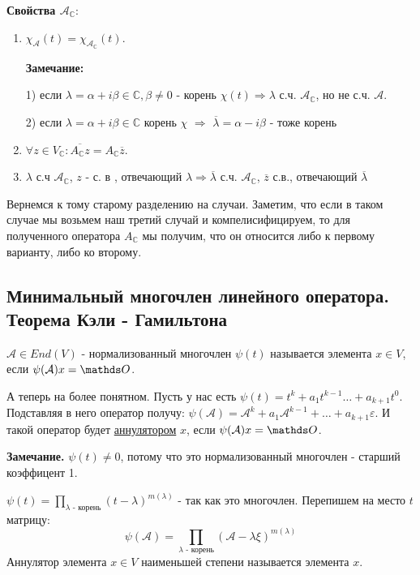 \textbf{Свойства $\mathcal{A_\mathbb{C}}$}:

\begin{enumerate}
    \item $\chi_{\mathcal{A}} (t)= \chi_\mathcal{A_\mathbb{C}}(t)$.

    \textbf{Замечание:} 
    
    1) если $\lambda = \alpha + i\beta \in \mathbb{C}, \beta \neq 0$ - корень $\chi(t) \Rightarrow \lambda$ с.ч. $\mathcal{A_\mathbb{C}}$, но не с.ч. $\mathcal{A}$.

    2) если $\lambda = \alpha + i\beta \in \mathbb{C}$ корень $\chi$ $\Rightarrow$ $\overline{\lambda}=\alpha - i\beta$ - тоже корень

    \item $\forall z \in V_{\mathbb{C}}: \overline{A_{\mathbb{C}}z } = A_{\mathbb{C}}\overline{z}$.

    \item $\lambda$ с.ч $\mathcal{A_\mathbb{C}} $, $z$ - с. в , отвечающий $\lambda$$\Rightarrow$$ \overline{\lambda}$ с.ч. $\mathcal{A_\mathbb{C}}$, $\overline{z}$ с.в., отвечающий $\overline{\lambda}$
\end{enumerate}

Вернемся к тому старому разделению на случаи. Заметим, что если в таком случае мы возьмем наш третий случай и компелисифицируем, то для полученного оператора $A_{\mathbb{C}}$ мы получим, что он относится либо к первому варианту, либо ко второму.

\subsection{Минимальный многочлен линейного оператора. Теорема Кэли - Гамильтона}

 $\mathcal{A}\in End(V)$ - нормализованный многочлен $\psi(t)$ называется  элемента $x \in V$, если $\psi(\mathcal{A}) x = \zero$.

А теперь на более понятном. Пусть у нас есть  $\psi(t) = t^k +a_1t^{k-1} \ldots +a_{k+1}t^0$. Подставляя в него оператор получу: $\psi(\mathcal{A}) = \mathcal{A}^k +a_1\mathcal{A}^{k-1}+\ldots + a_{k+1}\varepsilon$. И такой оператор будет \uline{аннулятором} $x$, если $\psi(\mathcal{A})x = \zero$.

\textbf{Замечание.} $\psi(t) \neq 0$, потому что это нормализованный многочлен - старший коэффицент 1.

$\psi(t) = \prod\limits_{\lambda \text{ - корень}}(t-\lambda)^{m(\lambda)}$ -  так как это многочлен. Перепишем на место $t$ матрицу:
$$\psi(\mathcal{A} ) = \prod\limits_{\lambda \text{ - корень} }(\mathcal{A} -\lambda  \xi)^{m(\lambda)}$$
 Аннулятор элемента $x\in V$ наименьшей степени называется  элемента $x$.   

